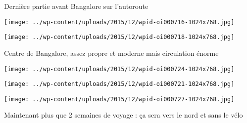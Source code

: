  \newline
 Dernière partie avant Bangalore sur l'autoroute \newline
 \newline
\centerline{\texttt{[image: ../wp-content/uploads/2015/12/wpid-oi000716-1024x768.jpg]} } 
 \newline
 \newline
\centerline{\texttt{[image: ../wp-content/uploads/2015/12/wpid-oi000718-1024x768.jpg]} } 
 \newline
 Centre de Bangalore, assez propre et moderne mais circulation énorme \newline
 \newline
\centerline{\texttt{[image: ../wp-content/uploads/2015/12/wpid-oi000724-1024x768.jpg]} } 
 \newline
 \newline
\centerline{\texttt{[image: ../wp-content/uploads/2015/12/wpid-oi000721-1024x768.jpg]} } 
 \newline
 \newline
\centerline{\texttt{[image: ../wp-content/uploads/2015/12/wpid-oi000727-1024x768.jpg]} } 
 \newline
 Maintenant plus que 2 semaines de voyage : ça sera vers le nord et sans le vélo \newline

\newpage
 

